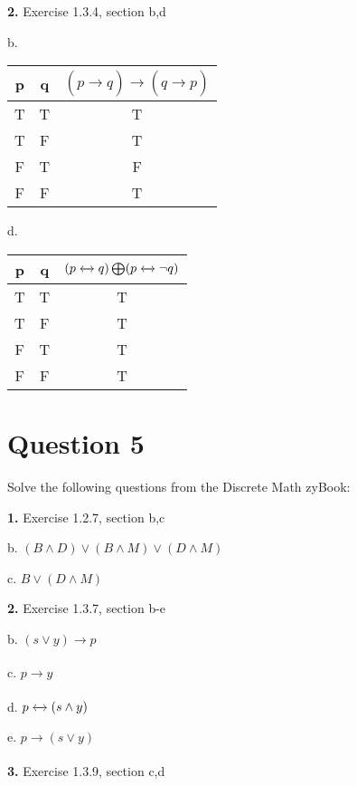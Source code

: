 \documentclass[11pt]{article}
\begin{document}
	\vspace{3mm}
	\textbf{2.} Exercise 1.3.4, section b,d
	\medskip
	
	b.
	\begin{center}
    \begin{tabular}{||c c c||} 
    \hline
    p & q & $(p\xrightarrow[]{}q)\xrightarrow[]{}(q\xrightarrow[]{}p)$ \\ [0.5ex] 
    \hline\hline
    T & T & T \\ 
    \hline
    T & F & T \\
    \hline
    F & T & F \\
    \hline
    F & F & T \\
    \hline
    \end{tabular}
    \end{center}	
    
    d.
	\begin{center}
    \begin{tabular}{||c c c||} 
    \hline
    p & q & $(p\xleftrightarrow[]{}q)\bigoplus(p\xleftrightarrow[]{}\neg q)$ \\ [0.5ex] 
    \hline\hline
    T & T & T \\ 
    \hline
    T & F & T \\
    \hline
    F & T & T \\
    \hline
    F & F & T \\
    \hline
    \end{tabular}
    \end{center}	
	

	\newpage
	\section*{Question 5}
	Solve the following questions from the Discrete Math zyBook:
	
	\textbf{1.} Exercise 1.2.7, section b,c
	\medskip
	
	b. $(B \wedge D) \vee (B \wedge M) \vee (D \wedge M)$
	
	c. $B \vee (D \wedge M)$

	\vspace{3mm}
	\textbf{2.} Exercise 1.3.7, section b-e
	\medskip
	
	b. $(s \vee y)\xrightarrow[]{}p$
	
	c. $p \xrightarrow[]{}y$
	
	d. $p\xleftrightarrow[]{}(s \wedge y)$
	
	e. $p\xrightarrow[]{}(s \vee y)$
	

	\vspace{3mm}
	\textbf{3.} Exercise 1.3.9, section c,d
	\medskip
	
\end{document}
